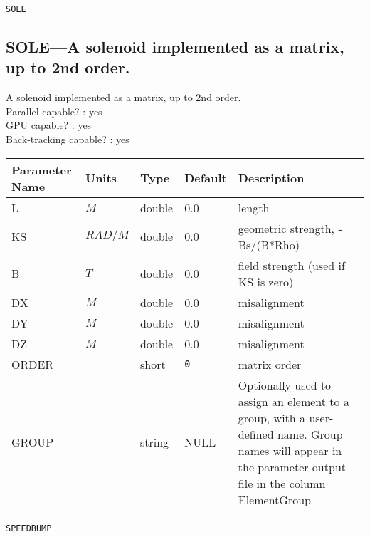 \vspace*{0.5in}

\newpage
\begin{center}{\Large\verb|SOLE|}\end{center}
\subsection{SOLE---A solenoid implemented as a matrix, up to 2nd order.}
A solenoid implemented as a matrix, up to 2nd order.
\\
Parallel capable? : yes\\
GPU capable? : yes\\
Back-tracking capable? : yes\\
\begin{tabular}{|l|l|l|l|p{\descwidth}|} \hline
Parameter Name & Units & Type & Default & Description \\ \hline 
L & $M$ & double &  0.0 & length  \\ \hline 
KS & $RAD/M$ & double &  0.0 & geometric strength, -Bs/(B*Rho)  \\ \hline 
B & $T$ & double &  0.0 & field strength (used if KS is zero)  \\ \hline 
DX & $M$ & double &  0.0 & misalignment  \\ \hline 
DY & $M$ & double &  0.0 & misalignment  \\ \hline 
DZ & $M$ & double &  0.0 & misalignment  \\ \hline 
ORDER &  & short &  \verb|0| & matrix order  \\ \hline 
GROUP &  & string & NULL & Optionally used to assign an element to a group, with a user-defined name.  Group names will appear in the parameter output file in the column ElementGroup  \\ \hline 
\end{tabular}

\newpage
\begin{center}{\Large\verb|SPEEDBUMP|}\end{center}
